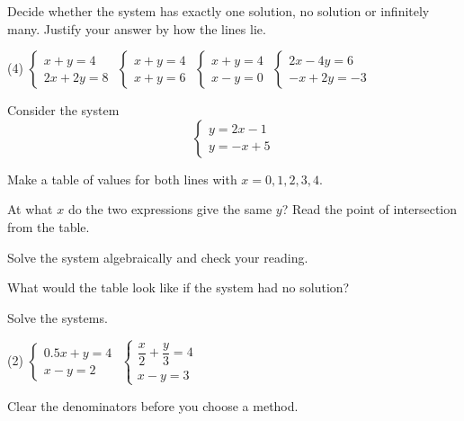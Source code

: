 Decide whether the system has exactly one solution, no solution or infinitely many. Justify your
answer by how the lines lie.
\begin{delar}[column-sep=0.4em](4)
  \task $\begin{cases} x + y = 4 \\ 2x + 2y = 8 \end{cases}$
  \task $\begin{cases} x + y = 4 \\ x + y = 6 \end{cases}$
  \task $\begin{cases} x + y = 4 \\ x - y = 0 \end{cases}$
  \task $\begin{cases} 2x - 4y = 6 \\ -x + 2y = -3 \end{cases}$
\end{delar}

Consider the system
\[
  \begin{cases}
    y = 2x - 1 \\
    y = -x + 5
  \end{cases}
\]
\begin{parts}
  \item Make a table of values for both lines with $x = 0, 1, 2, 3, 4$.
  \item At what $x$ do the two expressions give the same $y$? Read the point of intersection from
    the table.
  \item Solve the system algebraically and check your reading.
  \item What would the table look like if the system had no solution?
\end{parts}

Solve the systems.
\begin{delar}(2)
  \task $\begin{cases} 0.5x + y = 4 \\ x - y = 2 \end{cases}$
  \task $\begin{cases} \dfrac{x}{2} + \dfrac{y}{3} = 4 \\ x - y = 3 \end{cases}$
\end{delar}

\begin{aside}
\note[Tip] Clear the denominators before you choose a method.
\end{aside}

